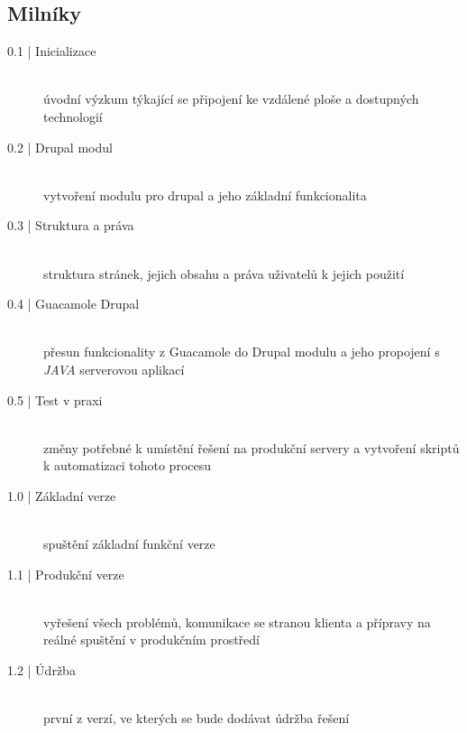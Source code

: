 \subsection*{Milníky}
\begin{description}
  \item[0.1 | Inicializace] \hfill \\
    úvodní výzkum týkající se připojení ke vzdálené ploše a dostupných technologií
  \item[0.2 | Drupal modul] \hfill \\
    vytvoření modulu pro drupal a jeho základní funkcionalita
  \item[0.3 | Struktura a práva] \hfill \\
    struktura stránek, jejich obsahu a práva uživatelů k jejich použití
  \item[0.4 | Guacamole Drupal] \hfill \\
    přesun funkcionality z Guacamole do Drupal modulu a jeho propojení s \emph{JAVA} serverovou aplikací
  \item[0.5 | Test v praxi] \hfill \\
    změny potřebné k umístění řešení na produkční servery a vytvoření skriptů k automatizaci tohoto procesu
  \item[1.0 | Základní verze] \hfill \\
    spuštění základní funkční verze
  \item[1.1 | Produkční verze] \hfill \\
    vyřešení všech problémů, komunikace se stranou klienta a přípravy na reálné spuštění v produkčním prostředí
  \item[1.2 | Údržba] \hfill \\
    první z verzí, ve kterých se bude dodávat údržba řešení
\end{description}
